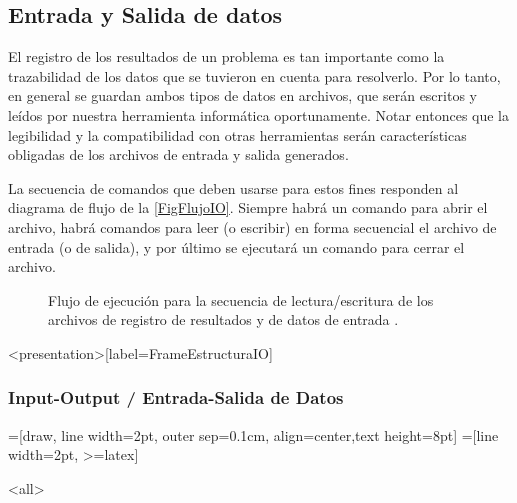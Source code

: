 \subsection{Entrada y Salida de datos}


El registro de los resultados de un problema es tan 
importante como la trazabilidad de los datos 
que se tuvieron en cuenta para resolverlo. Por lo tanto, 
en general se guardan ambos tipos de datos en archivos, 
que serán escritos y leídos por nuestra herramienta 
informática oportunamente. Notar entonces que la legibilidad
y la compatibilidad con otras herramientas 
serán características obligadas de los archivos
de entrada y salida generados.

La secuencia de comandos que deben usarse para estos
fines responden al diagrama de flujo de la 
\autoref{FigFlujoIO}. Siempre habrá un comando para 
abrir el archivo, habrá comandos para leer (o 
escribir) en forma secuencial  el archivo de entrada
(o de salida), y por último se ejecutará un comando 
para cerrar el archivo.

\begin{figure}
\caption{Flujo de ejecución para la secuencia de 
lectura/escritura de los archivos de registro de resultados
y de datos de entrada \label{FigFlujoIO}.}
\end{figure}

\mode*


\begin{frame}<presentation>[label=FrameEstructuraIO]
\frametitle{Input-Output / Entrada-Salida de Datos}
=[draw, line width=2pt,
  outer sep=0.1cm, align=center,text height=8pt]
=[line width=2pt, >=latex]

\end{frame}


\mode<all>
